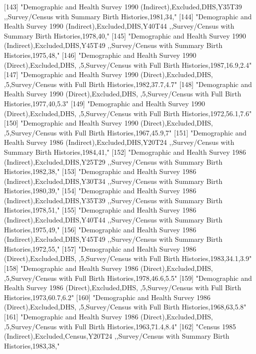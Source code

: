 [143] "Demographic and Health Survey 1990 (Indirect),Excluded,DHS,Y35T39 ,,Survey/Census with Summary Birth Histories,1981,34,"      
[144] "Demographic and Health Survey 1990 (Indirect),Excluded,DHS,Y40T44 ,,Survey/Census with Summary Birth Histories,1978,40,"      
[145] "Demographic and Health Survey 1990 (Indirect),Excluded,DHS,Y45T49 ,,Survey/Census with Summary Birth Histories,1975,48,"      
[146] "Demographic and Health Survey 1990 (Direct),Excluded,DHS, ,5,Survey/Census with Full Birth Histories,1987,16.9,2.4"           
[147] "Demographic and Health Survey 1990 (Direct),Excluded,DHS, ,5,Survey/Census with Full Birth Histories,1982,37.7,4.7"           
[148] "Demographic and Health Survey 1990 (Direct),Excluded,DHS, ,5,Survey/Census with Full Birth Histories,1977,40,5.3"             
[149] "Demographic and Health Survey 1990 (Direct),Excluded,DHS, ,5,Survey/Census with Full Birth Histories,1972,56.1,7.6"           
[150] "Demographic and Health Survey 1990 (Direct),Excluded,DHS, ,5,Survey/Census with Full Birth Histories,1967,45.9,7"             
[151] "Demographic and Health Survey 1986 (Indirect),Excluded,DHS,Y20T24 ,,Survey/Census with Summary Birth Histories,1984,41,"      
[152] "Demographic and Health Survey 1986 (Indirect),Excluded,DHS,Y25T29 ,,Survey/Census with Summary Birth Histories,1982,38,"      
[153] "Demographic and Health Survey 1986 (Indirect),Excluded,DHS,Y30T34 ,,Survey/Census with Summary Birth Histories,1980,39,"      
[154] "Demographic and Health Survey 1986 (Indirect),Excluded,DHS,Y35T39 ,,Survey/Census with Summary Birth Histories,1978,51,"      
[155] "Demographic and Health Survey 1986 (Indirect),Excluded,DHS,Y40T44 ,,Survey/Census with Summary Birth Histories,1975,49,"      
[156] "Demographic and Health Survey 1986 (Indirect),Excluded,DHS,Y45T49 ,,Survey/Census with Summary Birth Histories,1972,55,"      
[157] "Demographic and Health Survey 1986 (Direct),Excluded,DHS, ,5,Survey/Census with Full Birth Histories,1983,34.1,3.9"           
[158] "Demographic and Health Survey 1986 (Direct),Excluded,DHS, ,5,Survey/Census with Full Birth Histories,1978,46.6,5.5"           
[159] "Demographic and Health Survey 1986 (Direct),Excluded,DHS, ,5,Survey/Census with Full Birth Histories,1973,60.7,6.2"           
[160] "Demographic and Health Survey 1986 (Direct),Excluded,DHS, ,5,Survey/Census with Full Birth Histories,1968,63,5.8"             
[161] "Demographic and Health Survey 1986 (Direct),Excluded,DHS, ,5,Survey/Census with Full Birth Histories,1963,71.4,8.4"           
[162] "Census 1985 (Indirect),Excluded,Census,Y20T24 ,,Survey/Census with Summary Birth Histories,1983,38,"                          
